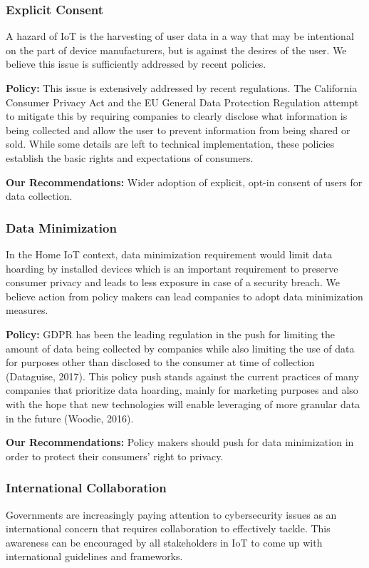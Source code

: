 \subsubsection{Explicit Consent}
A hazard of IoT is the harvesting of user data in a way that may be intentional on the part of device manufacturers, but is against the desires of the user. We believe this issue is sufficiently addressed by recent policies.

{\bf Policy:} This issue is extensively addressed by recent regulations. The California Consumer Privacy Act and the EU General Data Protection Regulation attempt to mitigate this by requiring companies to clearly disclose what information is being collected and allow the user to prevent information from being shared or sold. While some details are left to technical implementation, these policies establish the basic rights and expectations of consumers. 

{\bf Our Recommendations:} Wider adoption of explicit, opt-in consent of users for data collection.


\subsubsection{Data Minimization}
In the Home IoT context, data minimization requirement would limit data hoarding by installed devices which is an important requirement to preserve consumer privacy and leads to less exposure in case of a security breach. We believe action from policy makers can lead companies to adopt data minimization measures. 

{\bf Policy:} GDPR has been the leading regulation in the push for limiting the amount of data being collected by companies while also limiting the use of data for purposes other than disclosed to the consumer at time of collection (Dataguise, 2017). This policy push stands against the current practices of many companies that prioritize data hoarding, mainly for marketing purposes and also with the hope that new technologies will enable leveraging of more granular data in the future (Woodie, 2016).

{\bf Our Recommendations:} Policy makers should push for data minimization in order to protect their consumers’ right to privacy. 

\subsubsection{International Collaboration}
Governments are increasingly paying attention to cybersecurity issues as an international concern that requires collaboration to effectively tackle. This awareness can be encouraged by all stakeholders in IoT to come up with international guidelines and frameworks.

